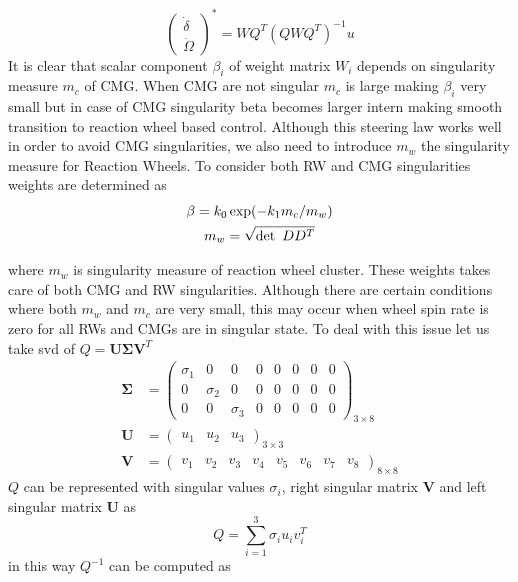 \begin{equation}
\begin{pmatrix}
\dot{\delta }\\
\dot{\Omega }
\end{pmatrix}^{*} =WQ^{T}\left( QWQ^{T}\right)^{-1} u
\label{eqn:vscmg_steering_1}
\end{equation}
It is clear that scalar component $\displaystyle \beta _{i}$ of weight matrix $\displaystyle W_{i}$ depends on singularity measure $\displaystyle m_{c}$ of CMG. When CMG are not singular $\displaystyle m_{c}$ is large making $\displaystyle \beta _{i}$ very small but in case of CMG singularity beta becomes larger intern making smooth transition to reaction wheel based control. Although this steering law works well in order to avoid CMG singularities, we also need to introduce $\displaystyle m_{w}$ the singularity measure for Reaction Wheels. To consider both RW and CMG singularities weights are determined as
\begin{gather}
\beta =k_{0}\exp( -k_{1} m_{c} /m_{w})\\
m_{w} =\sqrt{\det \ DD^{T}} \notag
\end{gather}

where $\displaystyle m_{w}$ is singularity measure of reaction wheel cluster. These weights takes care of both CMG and RW singularities. Although there are certain conditions where both $\displaystyle m_{w}$ and $\displaystyle m_{c}$ are very small, this may occur when wheel spin rate is zero for all RWs and CMGs are in singular state. To deal with this issue let us take \acrlong{svd} of $\displaystyle Q=\mathbf{U\Sigma V}^{T}$
\begin{equation*}
\begin{aligned}
\mathbf{\Sigma } & =\begin{pmatrix}
\sigma _{1} & 0 & 0 & 0 & 0 & 0 & 0 & 0\\
0 & \sigma _{2} & 0 & 0 & 0 & 0 & 0 & 0\\
0 & 0 & \sigma _{3} & 0 & 0 & 0 & 0 & 0
\end{pmatrix}_{3\times 8}\\
\mathbf{U} & =\begin{pmatrix}
u_{1} & u_{2} & u_{3}
\end{pmatrix}_{3\times 3}\\
\mathbf{V} & =\begin{pmatrix}
v_{1} & v_{2} & v_{3} & v_{4} & v_{5} & v_{6} & v_{7} & v_{8}
\end{pmatrix}_{8\times 8}
\end{aligned}
\end{equation*}
$\displaystyle Q$ can be represented with singular values $\displaystyle \sigma _{i}$, right singular matrix $\displaystyle \mathbf{V}$ and left singular matrix $\displaystyle \mathbf{U}$ as
\begin{equation}
Q=\sum ^{3}_{i=1} \sigma _{i} u_{i} v^{T}_{i}
\end{equation}
in this way $\displaystyle Q^{-1}$ can be computed as


